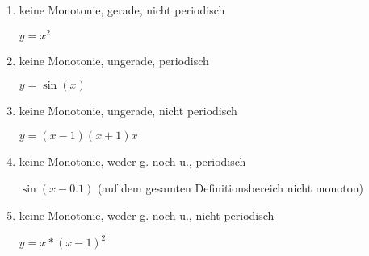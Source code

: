 \begin{enumerate}
\item keine Monotonie, gerade, nicht periodisch

$y=x^2$ 

\item keine Monotonie, ungerade, periodisch

$y=\sin(x)$ 

\item keine Monotonie, ungerade, nicht periodisch

$y=(x-1)(x+1)x$ 

\item keine Monotonie, weder g. noch u., periodisch

$\sin(x-0.1)$ (auf dem gesamten Definitionsbereich nicht monoton)

\item keine Monotonie, weder g. noch u., nicht periodisch

$y=x*(x-1)^2$

\end{enumerate}

